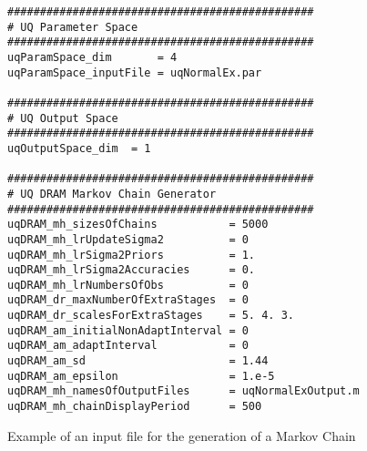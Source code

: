 \begin{figure}
\begin{verbatim}
###############################################
# UQ Parameter Space
###############################################
uqParamSpace_dim       = 4
uqParamSpace_inputFile = uqNormalEx.par

###############################################
# UQ Output Space
###############################################
uqOutputSpace_dim  = 1

###############################################
# UQ DRAM Markov Chain Generator
###############################################
uqDRAM_mh_sizesOfChains           = 5000
uqDRAM_mh_lrUpdateSigma2          = 0
uqDRAM_mh_lrSigma2Priors          = 1.
uqDRAM_mh_lrSigma2Accuracies      = 0.
uqDRAM_mh_lrNumbersOfObs          = 0
uqDRAM_dr_maxNumberOfExtraStages  = 0
uqDRAM_dr_scalesForExtraStages    = 5. 4. 3.
uqDRAM_am_initialNonAdaptInterval = 0
uqDRAM_am_adaptInterval           = 0
uqDRAM_am_sd                      = 1.44
uqDRAM_am_epsilon                 = 1.e-5
uqDRAM_mh_namesOfOutputFiles      = uqNormalExOutput.m
uqDRAM_mh_chainDisplayPeriod      = 500
\end{verbatim}
\caption{Example of an input file for the generation of a Markov Chain}
\label{fig-dram-input-file-ex}
\end{figure}

